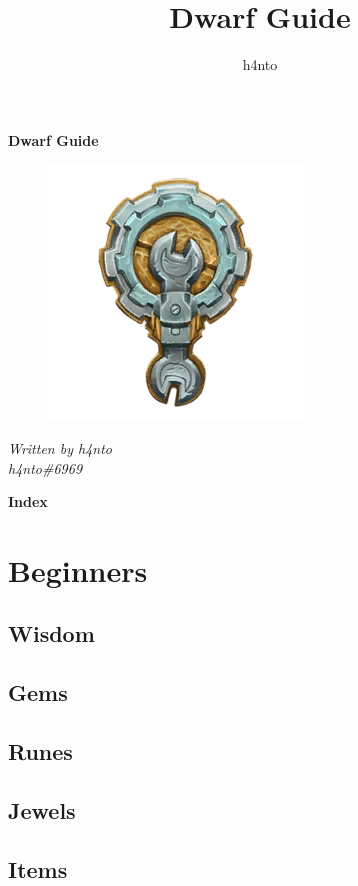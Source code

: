 \documentclass[14pt]{article}
\title{Dwarf Guide}
\author{h4nto}
\begin{document}

\begin{center}
    \Huge\textbf{Dwarf Guide} \\
    \begin{figure}[h]
        \includegraphics{dwarf.png}
        \centering
    \end{figure}
    \LARGE\textsl{Written by h4nto} \\
    \LARGE\textsl{h4nto\#6969}
\end{center}

\newpage


\begin{center}
    \huge\textbf{Index} \\
\end{center}

\tableofcontents

\newpage

\section{Beginners}
\subsection{Wisdom}
\subsection{Gems}
\subsection{Runes}
\subsection{Jewels}
\subsection{Items}
\end{document}
